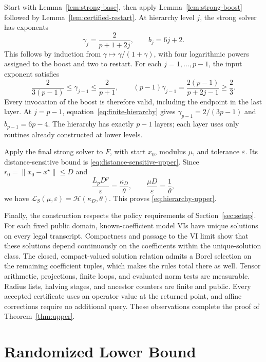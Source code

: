 \documentclass[11pt]{article}
\numberwithin{equation}{section}
\theoremstyle{definition}
\theoremstyle{remark}
\begin{document}
Start with Lemma~\ref{lem:strong-base}, then apply
Lemma~\ref{lem:strong-boost} followed by
Lemma~\ref{lem:certified-restart}. At hierarchy level \(j\), the strong
solver has exponents
\begin{equation}\label{eq:finite-hierarchy}
\gamma_j=\frac{2}{p+1+2j},
\qquad b_j=6j+2.
\end{equation}
This follows by induction from
\(\gamma\mapsto\gamma/(1+\gamma)\), with four logarithmic powers
assigned to the boost and two to restart. For each
\(j=1,\ldots,p-1\), the input exponent satisfies
\[
\frac{2}{3(p-1)}\le\gamma_{j-1}\le\frac{2}{p+1},
\qquad
(p-1)\gamma_{j-1}
=\frac{2(p-1)}{p+2j-1}\ge\frac23.
\]
Every invocation of the boost is therefore valid, including the endpoint
in the last layer. At \(j=p-1\), equation~\eqref{eq:finite-hierarchy} gives
\(\gamma_{p-1}=2/(3p-1)\) and \(b_{p-1}=6p-4\).
The hierarchy has exactly \(p-1\) layers; each layer uses only routines
already constructed at lower levels.

Apply the final strong solver to \(F\), with start \(x_0\), modulus
\(\mu\), and tolerance \(\varepsilon\). Its distance-sensitive bound
is \eqref{eq:distance-sensitive-upper}. Since \(r_0=\|x_0-x^\star\|\le D\) and
\begin{equation}\label{eq:log-identities}
\frac{L_pD^p}{\varepsilon}=\frac{\kappa_D}{\theta},
\qquad
\frac{\mu D}{\varepsilon}=\frac1\theta,
\end{equation}
we have
\(\mathcal L_S(\mu,\varepsilon)=\mathcal H(\kappa_D,\theta)\).
This proves \eqref{eq:hierarchy-upper}.

Finally, the construction respects the policy requirements of
Section~\ref{sec:setup}. For each fixed public domain, known-coefficient
model VIs have unique solutions on every legal transcript. Compactness
and passage to the VI limit show that these solutions depend continuously
on the coefficients within the unique-solution class. The closed,
compact-valued solution relation admits a Borel selection on the remaining
coefficient tuples, which makes the rules total there as well.
Tensor arithmetic, projections, finite loops, and evaluated norm tests
are measurable. Radius lists, halving stages, and ancestor counters are
finite and public. Every accepted certificate uses an operator value at
the returned point, and affine corrections require no additional query.
These observations complete the proof of Theorem~\ref{thm:upper}.

\section{Randomized Lower Bound}\label{sec:lower}
\end{document}

